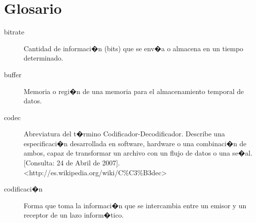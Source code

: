 \chapter{Glosario}
\label{sec:palabras}
\begin{description}

	
	\item[bitrate] Cantidad de informaci�n (bits) que se env�a o almacena en un tiempo determinado.

	\item[buffer] Memoria o regi�n de una memoria para el almacenamiento temporal de datos.


  \item[codec] Abreviatura del t�rmino Codificador-Decodificador. Describe una especificaci�n desarrollada en software, hardware o una combinaci�n de ambos, capaz de transformar un archivo con un flujo de datos o una se�al. [Consulta: 24 de Abril de 2007].\\<http://es.wikipedia.org/wiki/C\%C3\%B3dec>
  
  \item[codificaci�n] Forma que toma la informaci�n que se intercambia entre un emisor y un receptor de un lazo inform�tico.

	


\end{description}
